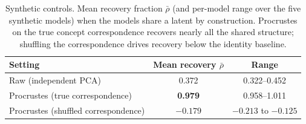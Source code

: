 \documentclass{article}
\begin{document}
\begin{table}[h]
\centering
\caption{Synthetic controls. Mean recovery fraction $\bar\rho$ (and per-model range over
the five synthetic models) when the models share a latent by construction. Procrustes on
the true concept correspondence recovers nearly all the shared structure; shuffling the
correspondence drives recovery below the identity baseline.}
\label{tab:synthetic}
\begin{tabular}{lcc}
\toprule
Setting & Mean recovery $\bar\rho$ & Range \\
\midrule
Raw (independent PCA)                & 0.372 & 0.322--0.452 \\
Procrustes (true correspondence)     & \textbf{0.979} & 0.958--1.011 \\
Procrustes (shuffled correspondence) & $-0.179$ & $-0.213$ to $-0.125$ \\
\bottomrule
\end{tabular}
\end{table}



\end{document}
